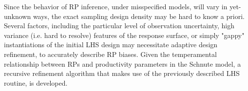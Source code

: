 %


%
Since the behavior of RP inference, under misspecified models, will vary in 
yet-unknown ways, the exact sampling design density may be hard to know a priori. 
Several factors, including the particular level of observation uncertainty, 
high variance (i.e. hard to resolve) features of the response surface, or 
simply "gappy" instantiations of the initial LHS design may necessitate 
adaptive design refinement, to accurately describe RP biases. Given the 
temperamental relationship between RPs and productivity parameters in the 
Schnute model, a recursive refinement algorithm that makes use of the 
previously described LHS routine, is developed. 


